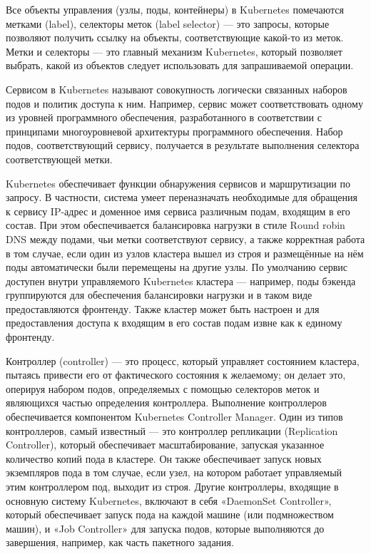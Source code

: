 Все объекты управления (узлы, поды, контейнеры) в Kubernetes помечаются метками (label), селекторы меток (label selector) --- это запросы, которые позволяют получить ссылку на объекты, соответствующие какой-то из меток. Метки и селекторы — это главный механизм Kubernetes, который позволяет выбрать, какой из объектов следует использовать для запрашиваемой операции.

Сервисом в Kubernetes называют совокупность логически связанных наборов подов и политик доступа к ним. Например, сервис может соответствовать одному из уровней программного обеспечения, разработанного в соответствии с принципами многоуровневой архитектуры программного обеспечения. Набор подов, соответствующий сервису, получается в результате выполнения селектора соответствующей метки.

Kubernetes обеспечивает функции обнаружения сервисов и маршрутизации по запросу. В частности, система умеет переназначать необходимые для обращения к сервису IP-адрес и доменное имя сервиса различным подам, входящим в его состав. При этом обеспечивается балансировка нагрузки в стиле Round robin DNS между подами, чьи метки соответствуют сервису, а также корректная работа в том случае, если один из узлов кластера вышел из строя и размещённые на нём поды автоматически были перемещены на другие узлы. По умолчанию сервис доступен внутри управляемого Kubernetes кластера --- например, поды бэкенда группируются для обеспечения балансировки нагрузки и в таком виде предоставляются фронтенду. Также кластер может быть настроен и для предоставления доступа к входящим в его состав подам извне как к единому фронтенду.

Контроллер (controller) --- это процесс, который управляет состоянием кластера, пытаясь привести его от фактического состояния к желаемому; он делает это, оперируя набором подов, определяемых с помощью селекторов меток и являющихся частью определения контроллера. Выполнение контроллеров обеспечивается компонентом Kubernetes Controller Manager. Один из типов контроллеров, самый известный — это контроллер репликации (Replication Controller), который обеспечивает масштабирование, запуская указанное количество копий пода в кластере. Он также обеспечивает запуск новых экземпляров пода в том случае, если узел, на котором работает управляемый этим контроллером под, выходит из строя. Другие контроллеры, входящие в основную систему Kubernetes, включают в себя «DaemonSet Controller», который обеспечивает запуск пода на каждой машине (или подмножеством машин), и «Job Controller» для запуска подов, которые выполняются до завершения, например, как часть пакетного задания.

